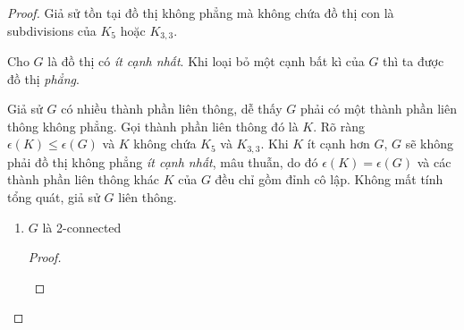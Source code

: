 \begin{proof}
    Giả sử tồn tại đồ thị không phẳng mà không chứa đồ thị con là subdivisions của $K_5$ hoặc $K_{3,3}$.

    Cho $G$ là đồ thị có \textit{ít cạnh nhất}. Khi loại bỏ một cạnh bất kì của $G$ thì ta được đồ thị \textit{phẳng}.

    Giả sử $G$ có nhiều thành phần liên thông, dễ thấy $G$ phải có một thành phần liên thông không phẳng. Gọi thành phần liên thông đó là $K$.
    Rõ ràng $\epsilon(K) \leq \epsilon(G)$ và $K$ không chứa $K_5$ và $K_{3,3}$. Khi $K$ ít cạnh hơn $G$, $G$ sẽ không phải đồ thị không phẳng \textit{ít cạnh nhất}, mâu thuẫn, do đó $\epsilon(K) = \epsilon(G)$
    và các thành phần liên thông khác $K$ của $G$ đều chỉ gồm đỉnh cô lập. Không mất tính tổng quát, giả sử $G$ liên thông.

    \begin{enumerate}
        \item $G$ là 2-connected
              \begin{proof}
                  \begin{figure}[H]
                      \centering
                  \end{figure}


\end{proof}
\end{enumerate}
\end{proof}
